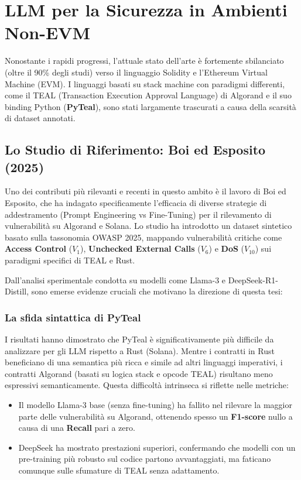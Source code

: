 \section{LLM per la Sicurezza in Ambienti Non-EVM}
Nonostante i rapidi progressi, l'attuale stato dell'arte è fortemente sbilanciato (oltre il 90\% degli studi) verso il linguaggio Solidity e l'Ethereum Virtual Machine (EVM). I linguaggi basati su stack machine con paradigmi differenti, come il TEAL (Transaction Execution Approval Language) di Algorand e il suo binding Python (\textbf{PyTeal}), sono stati largamente trascurati a causa della scarsità di dataset annotati.

\subsection{Lo Studio di Riferimento: Boi ed Esposito (2025)}
Uno dei contributi più rilevanti e recenti in questo ambito è il lavoro di Boi ed Esposito, che ha indagato specificamente l'efficacia di diverse strategie di addestramento (Prompt Engineering vs Fine-Tuning) per il rilevamento di vulnerabilità su Algorand e Solana.
Lo studio ha introdotto un dataset sintetico basato sulla tassonomia OWASP 2025, mappando vulnerabilità critiche come \textbf{Access Control} ($V_1$), \textbf{Unchecked External Calls} ($V_6$) e \textbf{DoS} ($V_{10}$) sui paradigmi specifici di TEAL e Rust.

Dall'analisi sperimentale condotta su modelli come Llama-3 e DeepSeek-R1-Distill, sono emerse evidenze cruciali che motivano la direzione di questa tesi:

\subsubsection{La sfida sintattica di PyTeal}
I risultati hanno dimostrato che PyTeal è significativamente più difficile da analizzare per gli LLM rispetto a Rust (Solana). Mentre i contratti in Rust beneficiano di una semantica più ricca e simile ad altri linguaggi imperativi, i contratti Algorand (basati su logica stack e opcode TEAL) risultano meno espressivi semanticamente.
Questa difficoltà intrinseca si riflette nelle metriche:
\begin{itemize}
    \item Il modello Llama-3 base (senza fine-tuning) ha fallito nel rilevare la maggior parte delle vulnerabilità su Algorand, ottenendo spesso un \textbf{F1-score} nullo a causa di una \textbf{Recall} pari a zero.
    \item DeepSeek ha mostrato prestazioni superiori, confermando che modelli con un pre-training più robusto sul codice partono avvantaggiati, ma faticano comunque sulle sfumature di TEAL senza adattamento.
\end{itemize}

